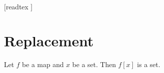 \documentclass[10pt]{article}
\begin{document}
  \begin{imports}
    \begin{forthel}
      [readtex ]
    \end{forthel}
  \end{imports}


  \section{Replacement}

  \begin{forthel}
    \begin{axiom}[title=Replacement Axiom,id=FOUNDATIONS_10_8142956584239104,printid]
      Let $f$ be a map and $x$ be a set.
      Then $f[x]$ is a set.
    \end{axiom}
  \end{forthel}
\end{document}
